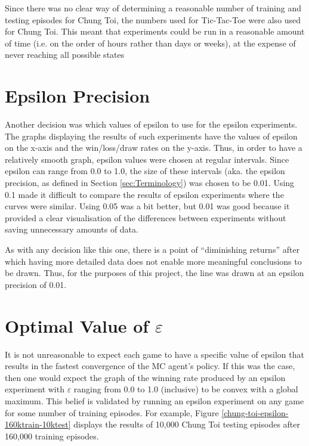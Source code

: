 \documentclass[11pt,a4paper]{report}
\begin{document}
Since there was no clear way of determining a reasonable number of training and testing episodes for Chung Toi, the numbers used for Tic-Tac-Toe were also used for Chung Toi. This meant that experiments could be run in a reasonable amount of time (i.e. on the order of hours rather than days or weeks), at the expense of never reaching all possible states


\section{Epsilon Precision}
\label{sec:epsilon-precision}

Another decision was which values of epsilon to use for the epsilon experiments. The graphs displaying the results of such experiments have the values of epsilon on the x-axis and the win/loss/draw rates on the y-axis. Thus, in order to have a relatively smooth graph, epsilon values were chosen at regular intervals. Since epsilon can range from 0.0 to 1.0, the size of these intervals (aka. the epsilon precision, as defined in Section \ref{sec:Terminology}) was chosen to be 0.01. Using 0.1 made it difficult to compare the results of epsilon experiments where the curves were similar. Using 0.05 was a bit better, but 0.01 was good because it provided a clear visualisation of the differences between experiments without saving unnecessary amounts of data.

As with any decision like this one, there is a point of ``diminishing returns'' after which having more detailed data does not enable more meaningful conclusions to be drawn. Thus, for the purposes of this project, the line was drawn at an epsilon precision of 0.01.


\section{Optimal Value of $\varepsilon$}
\label{sec:optimal_epsilon}

It is not unreasonable to expect each game to have a specific value of epsilon that results in the fastest convergence of the MC agent's policy. If this was the case, then one would expect the graph of the winning rate produced by an epsilon experiment with $\varepsilon$ ranging from 0.0 to 1.0 (inclusive) to be convex with a global maximum. This belief is validated by running an epsilon experiment on any game for some number of training episodes. For example, Figure \ref{chung-toi-epsilon-160ktrain-10ktest} displays the results of 10,000 Chung Toi testing episodes after 160,000 training episodes.
\end{document}
